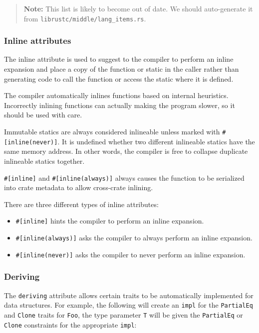 \documentclass[]{article}
\begin{document}
\begin{quote}
\textbf{Note:} This list is likely to become out of date. We should
auto-generate it from \texttt{librustc/middle/lang\_items.rs}.
\end{quote}

\subsubsection{Inline attributes}\label{inline-attributes}

The inline attribute is used to suggest to the compiler to perform an
inline expansion and place a copy of the function or static in the
caller rather than generating code to call the function or access the
static where it is defined.

The compiler automatically inlines functions based on internal
heuristics. Incorrectly inlining functions can actually making the
program slower, so it should be used with care.

Immutable statics are always considered inlineable unless marked with
\texttt{\#{[}inline(never){]}}. It is undefined whether two different
inlineable statics have the same memory address. In other words, the
compiler is free to collapse duplicate inlineable statics together.

\texttt{\#{[}inline{]}} and \texttt{\#{[}inline(always){]}} always
causes the function to be serialized into crate metadata to allow
cross-crate inlining.

There are three different types of inline attributes:

\begin{itemize}
\itemsep1pt\parskip0pt
\item
  \texttt{\#{[}inline{]}} hints the compiler to perform an inline
  expansion.
\item
  \texttt{\#{[}inline(always){]}} asks the compiler to always perform an
  inline expansion.
\item
  \texttt{\#{[}inline(never){]}} asks the compiler to never perform an
  inline expansion.
\end{itemize}

\subsubsection{Deriving}\label{deriving}

The \texttt{deriving} attribute allows certain traits to be
automatically implemented for data structures. For example, the
following will create an \texttt{impl} for the \texttt{PartialEq} and
\texttt{Clone} traits for \texttt{Foo}, the type parameter \texttt{T}
will be given the \texttt{PartialEq} or \texttt{Clone} constraints for
the appropriate \texttt{impl}:
\end{document}
